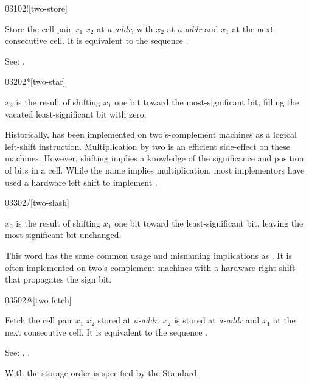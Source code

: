 \begin{newword}{0310}{2!}[two-store]

	Store the cell pair $x_1$ $x_2$ at \emph{a-addr}, with $x_2$ at
	\emph{a-addr} and $x_1$ at the next consecutive cell. It is
	equivalent to the sequence
	  \word{!}  \word{!}.

\item[See:]
	.
\end{newword}


\begin{newword}{0320}{2*}[two-star]

	$x_2$ is the result of shifting $x_1$ one bit toward the
	most-significant bit, filling the vacated least-significant
	bit with zero.

	\begin{rationale} %
		Historically,  has been implemented on
		two's-complement machines as a logical left-shift instruction.
		Multiplication by two is an efficient side-effect on these
		machines. However, shifting implies a knowledge of the
		significance and position of bits in a cell. While the name
		implies multiplication, most implementors have used a hardware
		left shift to implement .
	\end{rationale}
\end{newword}


\begin{newword}{0330}{2/}[two-slash]

	$x_2$ is the result of shifting $x_1$ one bit toward the
	least-significant bit, leaving the most-significant bit
	unchanged.

	\begin{rationale} %
		This word has the same common usage and misnaming implications
		as . It is often implemented on two's-complement
		machines with a hardware right shift that propagates the sign
		bit.
	\end{rationale}
\end{newword}


\begin{newword}{0350}{2@}[two-fetch]

	Fetch the cell pair $x_1$ $x_2$ stored at \emph{a-addr}. $x_2$
	is stored at \emph{a-addr} and $x_1$ at the next consecutive
	cell. It is equivalent to the sequence
	    .

\item[See:]
	,
	.

	\begin{rationale} %
		With  the storage order is specified by the Standard.
	\end{rationale}
\end{newword}


